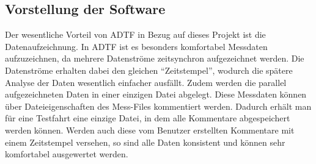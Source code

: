 \documentclass[12pt,a4paper]{report}
\begin{document}
\subsection{Vorstellung der Software}\label{subsec:Vorstellung der Software}
Der wesentliche Vorteil von ADTF in Bezug auf dieses Projekt ist die Datenaufzeichnung. In ADTF ist es besonders komfortabel Messdaten aufzuzeichnen, da mehrere Datenströme zeitsynchron aufgezeichnet werden. Die Datenströme erhalten dabei den gleichen "`Zeitstempel"', wodurch die spätere Analyse der Daten wesentlich einfacher ausfällt. Zudem werden die parallel aufgezeichneten Daten in einer einzigen Datei abgelegt. Diese Messdaten können über Dateieigenschaften des Mess-Files kommentiert werden. Dadurch erhält man für eine Testfahrt eine einzige Datei, in dem alle Kommentare abgespeichert werden können. Werden auch diese vom Benutzer erstellten Kommentare mit einem Zeitstempel versehen, so sind alle Daten konsistent und können sehr komfortabel ausgewertet werden.
\end{document}
